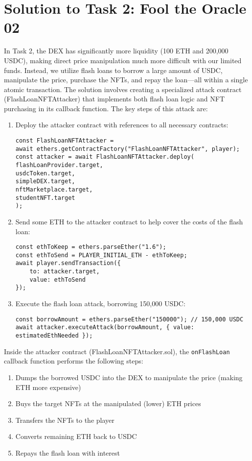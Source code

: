 \documentclass[12pt]{article}
\begin{document}
\section*{Solution to Task 2: Fool the Oracle 02}
In Task 2, the DEX has significantly more liquidity (100 ETH and 200,000 USDC), making direct price manipulation much more difficult with our limited funds. Instead, we utilize flash loans to borrow a large amount of USDC, manipulate the price, purchase the NFTs, and repay the loan—all within a single atomic transaction. The solution involves creating a specialized attack contract (FlashLoanNFTAttacker) that implements both flash loan logic and NFT purchasing in its callback function. The key steps of this attack are:

\begin{enumerate}
\item Deploy the attacker contract with references to all necessary contracts:
\begin{verbatim}
const FlashLoanNFTAttacker = 
await ethers.getContractFactory("FlashLoanNFTAttacker", player);
const attacker = await FlashLoanNFTAttacker.deploy(
flashLoanProvider.target,
usdcToken.target,
simpleDEX.target,
nftMarketplace.target,
studentNFT.target
);
\end{verbatim}

\item Send some ETH to the attacker contract to help cover the costs of the flash loan:
\begin{verbatim}
const ethToKeep = ethers.parseEther("1.6");
const ethToSend = PLAYER_INITIAL_ETH - ethToKeep;
await player.sendTransaction({
    to: attacker.target,
    value: ethToSend
});
\end{verbatim}

\item Execute the flash loan attack, borrowing 150,000 USDC:
\begin{verbatim}
const borrowAmount = ethers.parseEther("150000"); // 150,000 USDC
await attacker.executeAttack(borrowAmount, { value: estimatedEthNeeded });
\end{verbatim}
\end{enumerate}
Inside the attacker contract (FlashLoanNFTAttacker.sol), the \texttt{onFlashLoan} callback function performs the following steps:
\begin{enumerate}
\item Dumps the borrowed USDC into the DEX to manipulate the price (making ETH more expensive)
\item Buys the target NFTs at the manipulated (lower) ETH prices
\item Transfers the NFTs to the player
\item Converts remaining ETH back to USDC
\item Repays the flash loan with interest
\end{enumerate}
\end{document}
